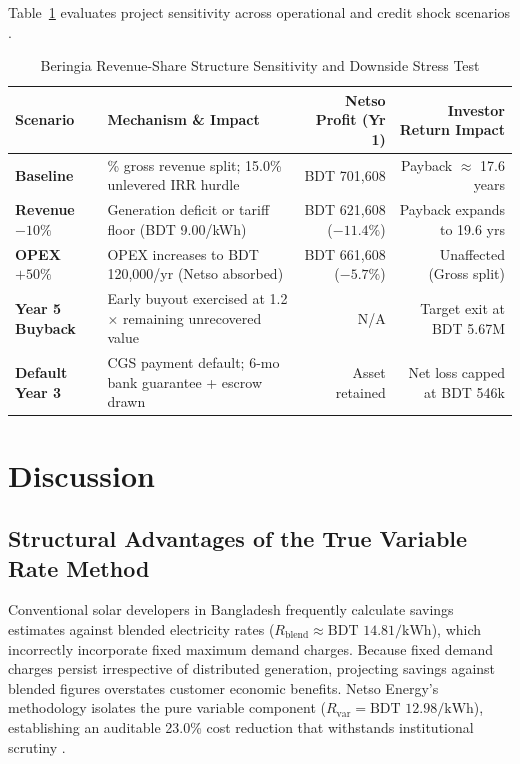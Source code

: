 \documentclass[11pt,a4paper]{article}
\begin{document}
Table~\ref{tab:stress_test} evaluates project sensitivity across operational and credit shock scenarios \cite{stress_test}.

\begin{table}[htbp]
\centering
\small
\caption{Beringia Revenue-Share Structure Sensitivity and Downside Stress Test}
\label{tab:stress_test}
\begin{tabularx}{\textwidth}{@{}l >{\raggedright\arraybackslash}X rr@{}}
\toprule
\textbf{Scenario} & \textbf{Mechanism \& Impact} & \textbf{Netso Profit (Yr 1)} & \textbf{Investor Return Impact} \\
\midrule
\textbf{Baseline} & 35\% gross revenue split; 15.0\% unlevered IRR hurdle & BDT 701,608 & Payback $\approx$ 17.6 years \\
\textbf{Revenue $-10\%$} & Generation deficit or tariff floor (BDT 9.00/kWh) & BDT 621,608 ($-11.4\%$) & Payback expands to 19.6 yrs \\
\textbf{OPEX $+50\%$} & OPEX increases to BDT 120,000/yr (Netso absorbed) & BDT 661,608 ($-5.7\%$) & Unaffected (Gross split) \\
\textbf{Year 5 Buyback} & Early buyout exercised at 1.2$\times$ remaining unrecovered value & N/A & Target exit at BDT 5.67M \\
\textbf{Default Year 3} & CGS payment default; 6-mo bank guarantee + escrow drawn & Asset retained & Net loss capped at BDT 546k \\
\bottomrule
\end{tabularx}
\end{table}

\section{Discussion}
\subsection{Structural Advantages of the True Variable Rate Method}
Conventional solar developers in Bangladesh frequently calculate savings estimates against blended electricity rates ($R_{\text{blend}} \approx \text{BDT } 14.81\text{/kWh}$), which incorrectly incorporate fixed maximum demand charges. Because fixed demand charges persist irrespective of distributed generation, projecting savings against blended figures overstates customer economic benefits. Netso Energy's methodology isolates the pure variable component ($R_{\text{var}} = \text{BDT } 12.98\text{/kWh}$), establishing an auditable 23.0\% cost reduction that withstands institutional scrutiny \cite{gt_constants, netso_venture}.
\end{document}
